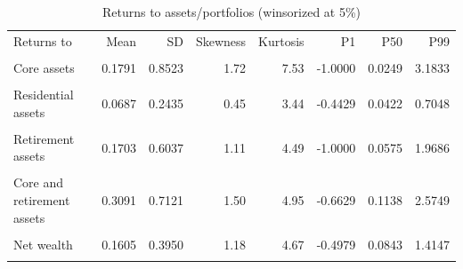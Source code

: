 \begin{table}[htbp]\centering\small
\caption{Returns to assets/portfolios (winsorized at 5\%)}
\label{tab:returns_portfolio_moments_pooled_w5}
\begin{tabular}{lrrrrrrr}\toprule
Returns to & Mean & SD & Skewness & Kurtosis & P1 & P50 & P99 \\\\ \midrule
Core assets & 0.1791 & 0.8523 & 1.72 & 7.53 & -1.0000 & 0.0249 & 3.1833 \\\\
Residential assets & 0.0687 & 0.2435 & 0.45 & 3.44 & -0.4429 & 0.0422 & 0.7048 \\\\
Retirement assets & 0.1703 & 0.6037 & 1.11 & 4.49 & -1.0000 & 0.0575 & 1.9686 \\\\
\addlinespace
Core and retirement assets & 0.3091 & 0.7121 & 1.50 & 4.95 & -0.6629 & 0.1138 & 2.5749 \\\\
Net wealth & 0.1605 & 0.3950 & 1.18 & 4.67 & -0.4979 & 0.0843 & 1.4147 \\\\
\bottomrule
\end{tabular}
\end{table}
